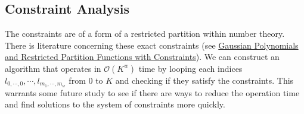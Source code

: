 \documentclass{article}
\begin{document}
\subsection{Constraint Analysis}

The constraints are of a form of a restricted partition within number theory. There is literature concerning these exact constraints (see \href{https://arxiv.org/pdf/1611.09931.pdf}{Gaussian Polynomials and
Restricted Partition Functions with Constraints}). We can construct an algorithm that operates in $\mathcal{O}(K^w)$ time by looping each indices $l_{0, \cdots, 0}, \cdots, l_{m_1, \cdots, m_w}$ from $0$ to $K$ and checking if they satisfy the constraints. This warrants some future study to see if there are ways to reduce the operation time and find solutions to the system of constraints more quickly.
\end{document}
